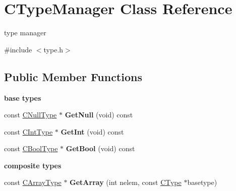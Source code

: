 \hypertarget{classCTypeManager}{\section{C\-Type\-Manager Class Reference}
\label{classCTypeManager}
}


type manager  




{\ttfamily \#include $<$type.\-h$>$}

\subsection*{Public Member Functions}
\begin{Indent}{\bf base types}\par
\begin{DoxyCompactItemize}
\item 
\hypertarget{classCTypeManager_a704caba798fc834cf2a0f878f9a13e82}{const \hyperlink{classCNullType}{C\-Null\-Type} $\ast$ {\bfseries Get\-Null} (void) const }\label{classCTypeManager_a704caba798fc834cf2a0f878f9a13e82}

\item 
\hypertarget{classCTypeManager_a9345e31b8e5cc8cecf4964123f1892b8}{const \hyperlink{classCIntType}{C\-Int\-Type} $\ast$ {\bfseries Get\-Int} (void) const }\label{classCTypeManager_a9345e31b8e5cc8cecf4964123f1892b8}

\item 
\hypertarget{classCTypeManager_a0ad37b57c3b8fd4d2b2d469cb1903393}{const \hyperlink{classCBoolType}{C\-Bool\-Type} $\ast$ {\bfseries Get\-Bool} (void) const }\label{classCTypeManager_a0ad37b57c3b8fd4d2b2d469cb1903393}

\end{DoxyCompactItemize}
\end{Indent}
\begin{Indent}{\bf composite types}\par
\begin{DoxyCompactItemize}
\item 
\hypertarget{classCTypeManager_ab7ebf34ad7b2718bf50854f13c54143d}{const \hyperlink{classCArrayType}{C\-Array\-Type} $\ast$ {\bfseries Get\-Array} (int nelem, const \hyperlink{classCType}{C\-Type} $\ast$basetype)}\label{classCTypeManager_ab7ebf34ad7b2718bf50854f13c54143d}

\end{DoxyCompactItemize}
\end{Indent}

